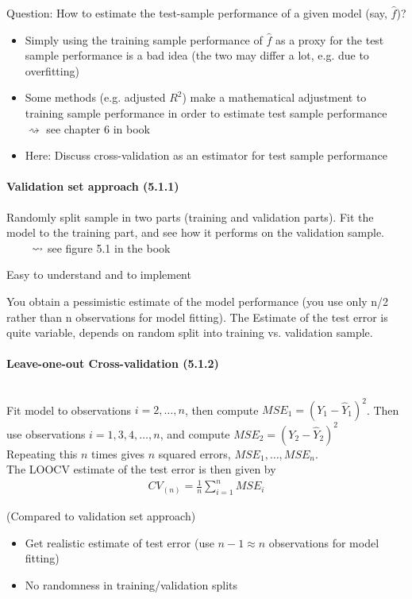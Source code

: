 \documentclass[11pt,a4paper,numbers=endperiod]{scrartcl}
\newcommand{\id}{\hspace*{4mm}}
\newcommand{\tit}[1]{\begin{large} \underline{\text{#1}}\end{large}}
\begin{document}
{Question: How to estimate the test-sample performance of a given model (say, $\hat{f}$)?
\begin{itemize}
	\item Simply using the training sample performance of $\hat{f}$ as a proxy for the test sample performance is a bad idea (the two may differ a lot, e.g. due to overfitting)
	\item Some methods (e.g. adjusted $R^2$) make a mathematical adjustment to training sample performance in order to estimate test sample performance $\rightsquigarrow$ see chapter 6 in book 
	\item Here: Discuss cross-validation as an estimator for test sample performance
\end{itemize}

\paragraph{Validation set approach (5.1.1)}
$ $\\

Randomly split sample in two parts (training and validation parts). Fit the model to the training part, and see how it performs on the validation sample.\\
$\id \id \rightsquigarrow$ see figure 5.1 in the book\\
\tit{Pro:} Easy to understand and to implement\\
\tit{Contra:} You obtain a pessimistic estimate of the model performance (you use only n/2 rather than n observations for model fitting). The Estimate of the test error is quite variable, depends on random split into training vs. validation sample.\\

\paragraph{Leave-one-out Cross-validation (5.1.2)}
$ $\\

\tit{Idea:} Fit model to observations $i = 2, \ldots, n$, then compute $MSE_1 = (Y_1 - \hat{Y}_1)^2$. Then use observations $i = 1, 3, 4, \ldots,n$, and compute $MSE_2 = (Y_2 - \hat{Y}_2)^2$\\

Repeating this $n$ times gives $n$ squared errors, $MSE_1, \ldots, MSE_n$.\\
The LOOCV estimate of the test error is then given by \begin{align*}
	CV_{(n)} = \frac{1}{n} \sum\limits_{i = 1}^n MSE_i
\end{align*}
\tit{Pro:} (Compared to validation set approach) \begin{itemize}
	\item Get realistic estimate of test error (use $n-1 \approx n$ observations for model fitting)
	\item No randomness in training/validation splits
\end{itemize}

}
\end{document}
